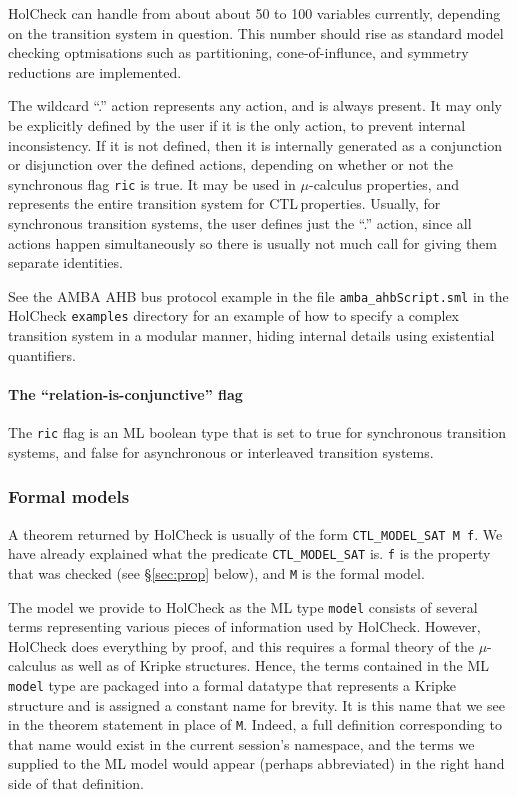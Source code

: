 \documentclass[12pt,fleqn]{article}
\newcommand{\ctl}{\textsf{CTL}\,}
\newcommand{\hc}{HolCheck}
\begin{document}
\hc{} can handle from about about 50 to 100 variables currently, depending on the transition system in question. This number should rise as standard model checking optmisations such as partitioning, cone-of-influnce, and symmetry reductions are implemented.

The wildcard ``.'' action represents any action, and is always present. It may only be explicitly defined by the user if it is the only action, to prevent internal inconsistency. If it is not defined, then it is internally generated as a conjunction or disjunction over the defined actions, depending on whether or not the synchronous flag \texttt{ric} is true. It may be used in \(\mu\)-calculus properties, and represents the entire transition system for \ctl properties. Usually, for synchronous transition systems, the user defines just the ``.'' action, since all actions happen simultaneously so there is usually not much call for giving them separate identities.

See the AMBA AHB bus protocol example in the file \texttt{amba\_ahbScript.sml} in the \hc{} \texttt{examples} directory for an example of how to specify a complex transition system in a modular manner, hiding internal details using existential quantifiers.

\paragraph{The ``relation-is-conjunctive'' flag} The \texttt{ric} flag is an ML boolean type that is set to true for synchronous transition systems, and false for asynchronous or interleaved transition systems.

\subsubsection{Formal models}\label{sec:formal_models}

A theorem returned by \hc{} is usually of the form \texttt{CTL\_MODEL\_SAT M f}. We have already explained what the predicate \texttt{CTL\_MODEL\_SAT} is. \texttt{f} is the property that was checked (see \S\ref{sec:prop} below), and \texttt{M} is the formal model.

The model we provide to \hc{} as the ML type \texttt{model} consists of several \HOL{} terms representing various pieces of information used by \hc{}. However, \hc{} does everything by proof, and this requires a formal \HOL{} theory of the \( \mu\)-calculus as well as of Kripke structures. Hence, the terms contained in the ML \texttt{model} type are packaged into a formal \HOL{} datatype that represents a Kripke structure and is assigned a constant name for brevity. It is this name that we see in the theorem statement in place of \texttt{M}. Indeed, a full \HOL{} definition corresponding to that name would exist in the current session's namespace, and the \HOL{} terms we supplied to the ML model would appear (perhaps abbreviated) in the right hand side of that definition.
\end{document}
